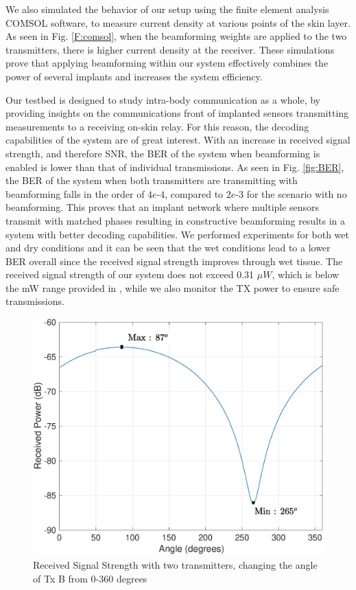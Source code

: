 We also simulated the behavior of our setup using the finite element analysis COMSOL software, to measure current density at various points of the skin layer. As seen in Fig. \ref{F:comsol}, when the beamforming weights are applied to the two transmitters, there is higher current density at the receiver. These simulations prove that applying beamforming within our system effectively combines the power of several implants and increases the system efficiency.

Our testbed is designed to study intra-body communication as a whole, by providing insights on the communications front of implanted sensors transmitting measurements to a receiving on-skin relay. For this reason, the decoding capabilities of the system are of great interest. With an increase in received signal strength, and therefore SNR, the BER of the system when beamforming is enabled is lower than that of individual transmissions. As seen in Fig. \ref{fig:BER}, the BER of the system when both transmitters are transmitting with beamforming falls in the order of $4e$-$4$, compared to $2e$-$3$ for the scenario with no beamforming. This proves that an implant network where multiple sensors transmit with matched phases resulting in constructive beamforming results in a system with better decoding capabilities. We performed experiments for both wet and dry conditions and it can be seen that the wet conditions lead to a lower BER overall since the received signal strength improves through wet tissue. The received signal strength of our system does not exceed 0.31 $ \mu W$, which is below the mW range provided in \cite{ICNIRP}, while we also monitor the TX power to ensure safe transmissions.
 \begin{figure}[t]
	\centering
	\includegraphics[width=0.95\linewidth]{figures/GC_beamforming/angle_sweep_fig.eps} 
	\caption{\label{fig:anglesweep} Received Signal Strength with two transmitters, changing the angle of Tx B from 0-360 degrees} \vspace{-2mm}
\vspace{-3mm}
\end{figure}


